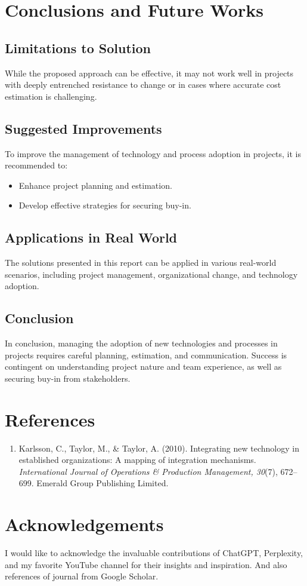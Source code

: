 \documentclass{article}
\begin{document}
\section{Conclusions and Future Works}
\subsection{Limitations to Solution}
While the proposed approach can be effective, it may not work well in projects with deeply entrenched resistance to change or in cases where accurate cost estimation is challenging.
\subsection{Suggested Improvements}
To improve the management of technology and process adoption in projects, it is recommended to:
\begin{itemize}
  \item Enhance project planning and estimation.
  \item Develop effective strategies for securing buy-in.
\end{itemize}
\subsection{Applications in Real World}
The solutions presented in this report can be applied in various real-world scenarios, including project management, organizational change, and technology adoption.
\subsection{Conclusion}
In conclusion, managing the adoption of new technologies and processes in projects requires careful planning, estimation, and communication. Success is contingent on understanding project nature and team experience, as well as securing buy-in from stakeholders.

\section{References}
\begin{enumerate}
  \item Karlsson, C., Taylor, M., \& Taylor, A. (2010). Integrating new technology in established organizations: A mapping of integration mechanisms. \textit{International Journal of Operations \& Production Management, 30}(7), 672--699. Emerald Group Publishing Limited.
  
\end{enumerate}



\section{Acknowledgements}
I would like to acknowledge the invaluable contributions of ChatGPT, Perplexity, and my favorite YouTube channel for their insights and inspiration. And also references of journal from Google Scholar.
\end{document}
